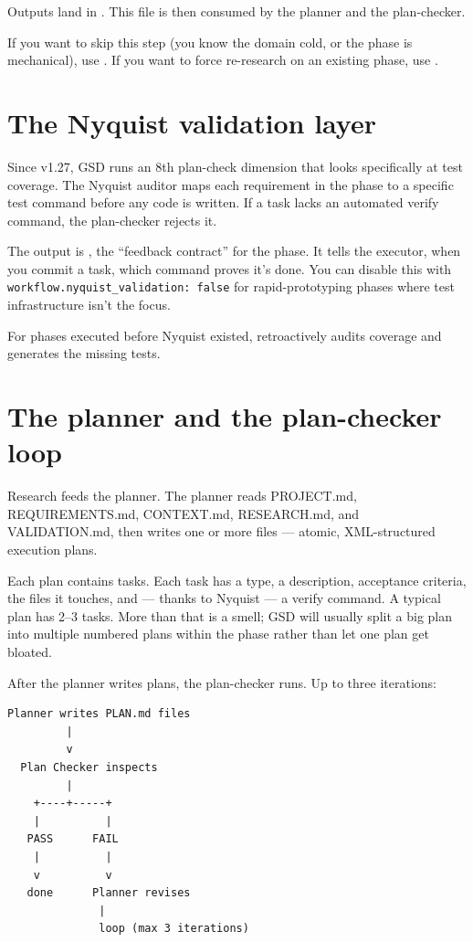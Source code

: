 \documentclass[11pt,letterpaper,openany]{book}
\begin{document}
Outputs land in . This file is then consumed by the planner and the plan-checker.

If you want to skip this step (you know the domain cold, or the phase is mechanical), use . If you want to force re-research on an existing phase, use .

\section{The Nyquist validation layer}

Since v1.27, GSD runs an 8th plan-check dimension that looks specifically at test coverage. The Nyquist auditor maps each requirement in the phase to a specific test command before any code is written. If a task lacks an automated verify command, the plan-checker rejects it.

The output is , the ``feedback contract'' for the phase. It tells the executor, when you commit a task, which command proves it's done. You can disable this with \texttt{workflow.nyquist\_validation: false} for rapid-prototyping phases where test infrastructure isn't the focus.

For phases executed before Nyquist existed,  retroactively audits coverage and generates the missing tests.

\section{The planner and the plan-checker loop}

Research feeds the planner. The planner reads PROJECT.md, REQUIREMENTS.md, CONTEXT.md, RESEARCH.md, and VALIDATION.md, then writes one or more  files --- atomic, XML-structured execution plans.

Each plan contains tasks. Each task has a type, a description, acceptance criteria, the files it touches, and --- thanks to Nyquist --- a verify command. A typical plan has 2--3 tasks. More than that is a smell; GSD will usually split a big plan into multiple numbered plans within the phase rather than let one plan get bloated.

After the planner writes plans, the plan-checker runs. Up to three iterations:

\begin{lstlisting}[style=gsddiagram]
  Planner writes PLAN.md files
         |
         v
  Plan Checker inspects
         |
    +----+-----+
    |          |
   PASS      FAIL
    |          |
    v          v
   done      Planner revises
              |
              loop (max 3 iterations)
\end{lstlisting}
\end{document}
